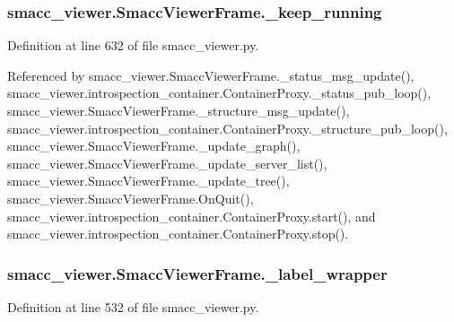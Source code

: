 \subsubsection[{\texorpdfstring{\+\_\+keep\+\_\+running}{_keep_running}}]{\setlength{\rightskip}{0pt plus 5cm}smacc\+\_\+viewer.\+Smacc\+Viewer\+Frame.\+\_\+keep\+\_\+running\hspace{0.3cm}{\ttfamily [private]}}\hypertarget{classsmacc__viewer_1_1SmaccViewerFrame_a20aa5e983200d5e77d659780d490d285}{}\label{classsmacc__viewer_1_1SmaccViewerFrame_a20aa5e983200d5e77d659780d490d285}


Definition at line 632 of file smacc\+\_\+viewer.\+py.



Referenced by smacc\+\_\+viewer.\+Smacc\+Viewer\+Frame.\+\_\+status\+\_\+msg\+\_\+update(), smacc\+\_\+viewer.\+introspection\+\_\+container.\+Container\+Proxy.\+\_\+status\+\_\+pub\+\_\+loop(), smacc\+\_\+viewer.\+Smacc\+Viewer\+Frame.\+\_\+structure\+\_\+msg\+\_\+update(), smacc\+\_\+viewer.\+introspection\+\_\+container.\+Container\+Proxy.\+\_\+structure\+\_\+pub\+\_\+loop(), smacc\+\_\+viewer.\+Smacc\+Viewer\+Frame.\+\_\+update\+\_\+graph(), smacc\+\_\+viewer.\+Smacc\+Viewer\+Frame.\+\_\+update\+\_\+server\+\_\+list(), smacc\+\_\+viewer.\+Smacc\+Viewer\+Frame.\+\_\+update\+\_\+tree(), smacc\+\_\+viewer.\+Smacc\+Viewer\+Frame.\+On\+Quit(), smacc\+\_\+viewer.\+introspection\+\_\+container.\+Container\+Proxy.\+start(), and smacc\+\_\+viewer.\+introspection\+\_\+container.\+Container\+Proxy.\+stop().

\subsubsection[{\texorpdfstring{\+\_\+label\+\_\+wrapper}{_label_wrapper}}]{\setlength{\rightskip}{0pt plus 5cm}smacc\+\_\+viewer.\+Smacc\+Viewer\+Frame.\+\_\+label\+\_\+wrapper\hspace{0.3cm}{\ttfamily [private]}}\hypertarget{classsmacc__viewer_1_1SmaccViewerFrame_a839af1f1021fa7e47ccdfd63d2c56406}{}\label{classsmacc__viewer_1_1SmaccViewerFrame_a839af1f1021fa7e47ccdfd63d2c56406}


Definition at line 532 of file smacc\+\_\+viewer.\+py.



